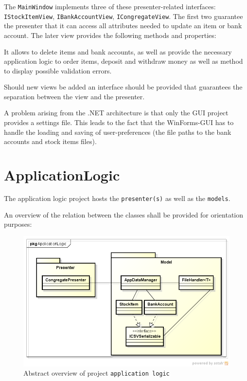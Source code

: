 

The \texttt{MainWindow} implements three of these presenter-related interfaces: \texttt{IStockItemView}, \texttt{IBankAccountView}, \texttt{ICongregateView}. The first two guarantee the presenter that it can access all attributes needed to update an item or bank account. The later view provides the following methods and properties:



It allows to delete items and bank accounts, as well as provide the necessary application logic to order items, deposit and withdraw money as well as method to display possible validation errors.

Should new views be added an interface should be provided that guarantees the separation between the view and the presenter.

A problem arising from the .NET architecture is that only the \ac{GUI} project provides a settings file. This leads to the fact that the WinForms-\ac{GUI} has to handle the loading and saving of user-preferences (the file paths to the bank accounts and stock items files).

\section{ApplicationLogic}
\label{sec:application_logic}

The application logic project hosts the \texttt{presenter(s)} as well as the \texttt{models}.

An overview of the relation between the classes shall be provided for orientation purposes:

\begin{figure}[H]
\begin{center}
\includegraphics[width=\textwidth]{gfx/application_logic.png}
\caption{Abstract overview of project \texttt{application logic}}
\label{fig:application_logic}
\end{center}
\end{figure}

